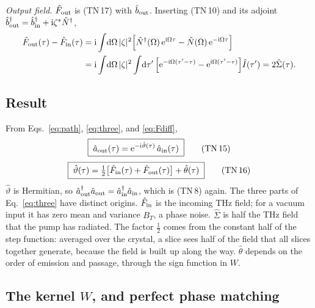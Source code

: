 \documentclass[aps,pra,onecolumn,notitlepage,11pt,amsmath,amssymb,nofootinbib]{revtex4-2}
\newcommand{\Nop}{\hat N}
\newcommand{\Iop}{\hat I}
\newcommand{\dd}{\mathrm{d}}
\newcommand{\ee}{\mathrm{e}}
\newcommand{\ii}{\mathrm{i}}
\newcommand{\TN}[1]{\text{TN\,#1}}
\begin{document}
\emph{Output field.} $\hat F_{\rm out}$ is (TN\,17) with $\hat b_{\rm out}$.
Inserting (TN\,10) and its adjoint
$\hat b_{\rm out}^\dagger=\hat b_{\rm in}^\dagger+\ii\zeta^*\Nop^\dagger$,
\begin{align}
\hat F_{\rm out}(\tau)-\hat F_{\rm in}(\tau)
&=\ii\int\!\dd\Omega\,|\zeta|^2\Big[\Nop^\dagger(\Omega)\,\ee^{\ii\Omega\tau}
-\Nop(\Omega)\,\ee^{-\ii\Omega\tau}\Big]\nonumber\\
&=\ii\int\!\dd\Omega\,|\zeta|^2\int\!\dd\tau'\,
\Big[\ee^{-\ii\Omega(\tau'-\tau)}-\ee^{\ii\Omega(\tau'-\tau)}\Big]\Iop(\tau')
=2\hat\Sigma(\tau).
\label{eq:Fdiff}
\end{align}

\subsection{Result}
\label{sec:pumpresult}

From Eqs.~\eqref{eq:path}, \eqref{eq:three}, and \eqref{eq:Fdiff},
\begin{equation}
\boxed{\;\hat a_{\rm out}(\tau)=\ee^{-\ii\hat\vartheta(\tau)}\,\hat a_{\rm in}(\tau)\;}
\tag{\TN{15}}
\end{equation}
\begin{equation}
\boxed{\;\hat\vartheta(\tau)=\tfrac12\big[\hat F_{\rm in}(\tau)+\hat F_{\rm out}(\tau)\big]
+\hat\theta(\tau)\;}
\tag{\TN{16}}
\end{equation}
$\hat\vartheta$ is Hermitian, so
$\hat a_{\rm out}^\dagger\hat a_{\rm out}=\hat a_{\rm in}^\dagger\hat a_{\rm in}$,
which is (TN\,8) again. The three parts of Eq.~\eqref{eq:three} have distinct
origins. $\hat F_{\rm in}$ is the incoming THz field; for a vacuum input it
has zero mean and variance $B_T$, a phase noise. $\hat\Sigma$ is half the THz
field that the pump has radiated. The factor $\tfrac12$ comes from the
constant half of the step function: averaged over the crystal, a slice sees
half of the field that all slices together generate, because the field is
built up along the way. $\hat\theta$ depends on the order of emission and
passage, through the sign function in $W$.

\subsection{The kernel \texorpdfstring{$W$}{W}, and perfect phase matching}
\end{document}

